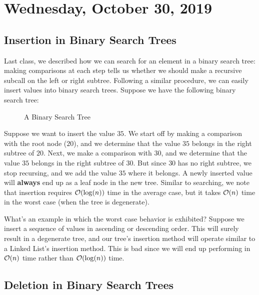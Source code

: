 \section{Wednesday, October 30, 2019}

\subsection{Insertion in Binary Search Trees}

Last class, we described how we can search for an element in a binary search tree: making comparisons at each step tells us whether we should make a recursive subcall on the left or right subtree. Following a similar procedure, we can easily insert values into binary search trees. Suppose we have the following binary search tree:

\begin{figure}[h]
\centering
{}
\caption{A Binary Search Tree}
\end{figure}

Suppose we want to insert the value $35$. We start off by making a comparison with the root node ($20$), and we determine that the value $35$ belongs in the right subtree of $20$. Next, we make a comparison with $30$, and we determine that the value $35$ belongs in the right subtree of $30$. But since $30$ has no right subtree, we stop recursing, and we add the value $35$ where it belongs. A newly inserted value will \textbf{always} end up as a leaf node in the new tree.  Similar to searching, we note that insertion requires $\mathcal{O}(\log(n))$ time in the average case, but it takes $\mathcal{O}(n)$ time in the worst case (when the tree is degenerate). 

What's an example in which the worst case behavior is exhibited? Suppose we insert a sequence of values in ascending or descending order. This will surely result in a degenerate tree, and our tree's insertion method will operate similar to a Linked List's insertion method. This is bad since we will end up performing in $\mathcal{O}(n)$ time rather than $\mathcal{O}(\log(n))$ time. 

\subsection{Deletion in Binary Search Trees}

